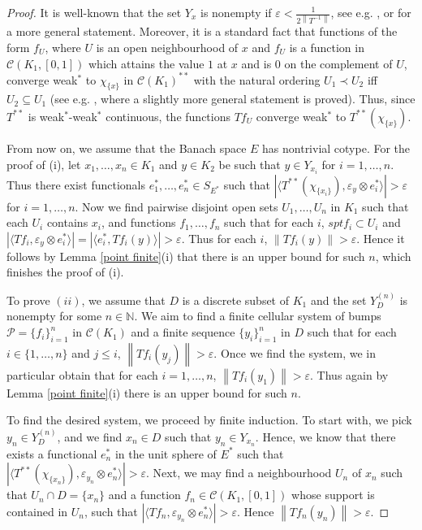 \documentclass{amsart}
\numberwithin{equation}{section}
\theoremstyle{definition}
\def\C{\mathcal C}
\def\ep{\varepsilon}
\def\en{\mathbb N}
\def\la{\langle}
\def\ra{\rangle}
\newcommand{\norm}[1]{\left\|#1\right\|}
\newcommand{\abs}[1]{\left| #1  \right|}
\begin{document}
\begin{proof}
It is well-known that the set $Y_x$ is nonempty if $\ep<\frac{1}{2\norm{T^{-1}}}$, see e.g. \cite[Proof of Theorem 1.4]{GalegoVillamizar}, or \cite[Lemma 4.2]{rondos-spurny-lattices} for a more general statement. Moreover, it is a standard fact that functions of the form $f_U$, where $U$ is an open neighbourhood of $x$ and $f_U$ is a function in $\C(K_1, [0, 1])$ which attains the value $1$ at $x$ and is $0$ on the complement of $U$, converge weak$^*$ to $\chi_{\{x\}}$ in $\C(K_1)^{**}$ with the natural ordering $U_1 \prec U_2$ iff $U_2 \subseteq U_1$ (see e.g. \cite[Lemma 4.1]{rondos-spurny-lattices}, where a slightly more general statement is proved). Thus, since $T^{**}$ is weak$^*$-weak$^*$ continuous, the functions $Tf_U$ converge weak$^*$ to $T^{**}(\chi_{\{x\}})$. 

From now on, we assume that the Banach space $E$ has nontrivial cotype. For the proof of (i), let $x_1, \ldots, x_n \in K_1$ and $y \in K_2$ be such that $y \in Y_{x_i}$ for $i=1, \ldots, n$. Thus there exist functionals $e_1^*, \ldots, e_n^* \in S_{E^*}$ such that $\abs{\la T^{**}(\chi_{\{x_i\}}), \ep_y \otimes e_i^* \ra}>\ep$ for $i=1, \ldots, n$. Now we find pairwise disjoint open sets $U_1, \ldots, U_n$ in $K_1$ such that each $U_i$ contains $x_i$, and functions $f_1, \ldots, f_n$ such that for each $i$, $spt f_i \subset U_i$ and $\abs{\la Tf_i, \ep_y \otimes e_i^* \ra}=\abs{\la e_i^*, Tf_i(y) \ra}>\ep$. Thus for each $i$, $\norm{Tf_i(y)} > \ep$. Hence it follows by Lemma \ref{point finite}(i) that there is an upper bound for such $n$, which finishes the proof of (i).

To prove $(ii)$, we assume that $D$ is a discrete subset of $K_1$ and the set $Y_D^{(n)}$ is nonempty for some $n \in \en$. We aim to find a finite cellular system of bumps $\mathcal{P}=\{f_i\}_{i=1}^{n}$ in $\C(K_1)$ and a finite sequence $\{y_i\}_{i=1}^{n}$ in $D$ such that for each $i \in \{1, \ldots, n\}$ and $j \leq i$, $\norm{Tf_i(y_j)}>\ep$. Once we find the system, we in particular obtain that for each $i=1, \ldots, n$, $\norm{Tf_i(y_1)}>\ep$. Thus again by Lemma \ref{point finite}(i) there is an upper bound for such $n$. 

To find the desired system, we proceed by finite induction. To start with, we pick $y_n \in Y_D^{(n)}$, and we find $x_n \in D$ such that $y_n \in Y_{x_n}$. Hence, we know that there exists a functional $e_n^*$ in the unit sphere of $E^*$ such that $\abs{\la T^{**}(\chi_{\{x_n\}}), \ep_{y_n} \otimes e_n^* \ra}>\ep$. Next, we may find a neighbourhood $U_n$ of $x_n$ such that $U_n \cap D=\{x_n\}$ and a function $f_n \in \C(K_1, [0, 1])$ whose support is contained in $U_n$, such that $\abs{\la Tf_n, \ep_{y_n} \otimes e_n^*\ra}>\ep$. Hence $\norm{Tf_n(y_n)}>\ep$.


\end{proof}
\end{document}
